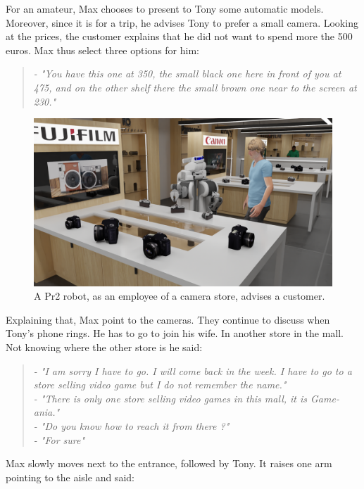For an amateur, Max chooses to present to Tony some automatic models. Moreover, since it is for a trip, he advises Tony to prefer a small camera. Looking at the prices, the customer explains that he did not want to spend more the 500 euros. Max thus select three options for him:

\begin{quote} 
\centering 
\textit{
- "You have this one at 350, the small black one here in front of you at 475, and on the other shelf there the small brown one near to the screen at 230." }
\end{quote}

\begin{figure}[h!]
\centering
\includegraphics[width=\textwidth]{figures/introduction/camera_store_2.png}
\caption{\label{fig:cam_store} A Pr2 robot, as an employee of a camera store, advises a customer. }
\end{figure}

Explaining that, Max point to the cameras. They continue to discuss when Tony's phone rings. He has to go to join his wife. In another store in the mall. Not knowing where the other store is he said:

\begin{quote} 
\centering 
\textit{
- "I am sorry I have to go. I will come back in the week. I have to go to a store selling video game but I do not remember the name." \\
- "There is only one store selling video games in this mall, it is Game-ania." \\
- "Do you know how to reach it from there ?" \\
- "For sure"}
\end{quote}

Max slowly moves next to the entrance, followed by Tony. It raises one arm pointing to the aisle and said:

